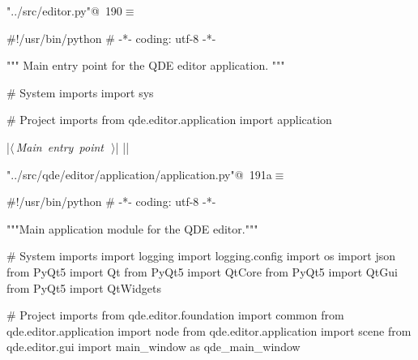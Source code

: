 \documentclass[%
    a4paper,    %
    justified,  %
    nobib,      %
    openany     %
]{tufte-book}
\makeatletter
\renewcommand{\label}[1]{\@tufte@label{##1}}%
\makeatother
\begin{document}
\begin{fullwidth}

\begin{flushleft} \small
\begin{minipage}{\linewidth}\label{scrap172}\raggedright\small
{} \verb@"../src/editor.py"@\nobreak\ {\footnotesize {190}}$\equiv$
\vspace{-1ex}
\begin{pythoncode}
#!/usr/bin/python
# -*- coding: utf-8 -*-

""" Main entry point for the QDE editor application. """

# System imports
import sys

# Project imports
from qde.editor.application import application

|\hbox{$\langle\,${\itshape Main entry point}\nobreak\ {\footnotesize {}}$\,\rangle$}|
|\NWsep|
\end{pythoncode}
\vspace{1.5ex}
\footnotesize
\begin{list}{}{\setlength{\itemsep}{-\parsep}\setlength{\itemindent}{-\leftmargin}}

\item{}
\end{list}
\end{minipage}\vspace{4ex}
\end{flushleft}

\begin{flushleft} \small
\begin{minipage}{\linewidth}\label{scrap173}\raggedright\small
{} \verb@"../src/qde/editor/application/application.py"@\nobreak\ {\footnotesize {191a}}$\equiv$
\vspace{-1ex}
\begin{pythoncode}
#!/usr/bin/python
# -*- coding: utf-8 -*-

"""Main application module for the QDE editor."""

# System imports
import logging
import logging.config
import os
import json
from PyQt5 import Qt
from PyQt5 import QtCore
from PyQt5 import QtGui
from PyQt5 import QtWidgets

# Project imports
from qde.editor.foundation import common
from qde.editor.application import node
from qde.editor.application import scene
from qde.editor.gui import main_window as qde_main_window



\end{pythoncode}
\end{minipage}
\end{flushleft}
\end{fullwidth}
\end{document}
